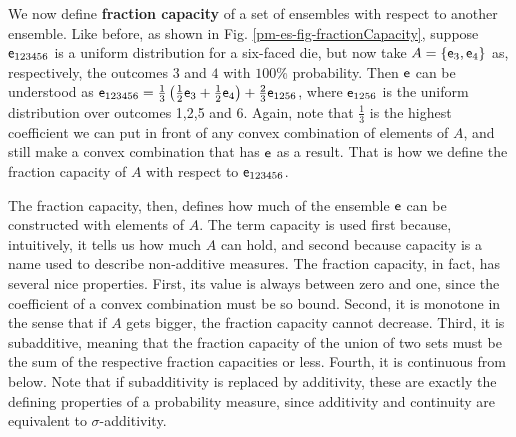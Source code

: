 We now define \textbf{fraction capacity} of a set of ensembles with respect to another ensemble. Like before, as shown in Fig. \ref{pm-es-fig-fractionCapacity}, suppose $\mathsf{e}_{123456}$ is a uniform distribution for a six-faced die, but now take $A = \{ \mathsf{e}_3, \mathsf{e}_4 \}$ as, respectively, the outcomes $3$ and $4$ with $100\%$ probability. Then $\mathsf{e}$ can be understood as $\mathsf{e}_{123456} = \frac{1}{3} \left(\frac{1}{2} \mathsf{e}_3 + \frac{1}{2} \mathsf{e}_4 \right) + \frac{2}{3} \mathsf{e}_{1256}$, where $\mathsf{e}_{1256}$ is the uniform distribution over outcomes 1,2,5 and 6. Again, note that $\frac{1}{3}$ is the highest coefficient we can put in front of any convex combination of elements of $A$, and still make a convex combination that has $\mathsf{e}$ as a result. That is how we define the fraction capacity of $A$ with respect to $\mathsf{e}_{123456}$.

The fraction capacity, then, defines how much of the ensemble $\mathsf{e}$ can be constructed with elements of $A$. The term capacity is used first because, intuitively, it tells us how much $A$ can hold, and second because capacity is a name used to describe non-additive measures. The fraction capacity, in fact, has several nice properties. First, its value is always between zero and one, since the coefficient of a convex combination must be so bound. Second, it is monotone in the sense that if $A$ gets bigger, the fraction capacity cannot decrease. Third, it is subadditive, meaning that the fraction capacity of the union of two sets must be the sum of the respective fraction capacities or less. Fourth, it is continuous from below. Note that if subadditivity is replaced by additivity, these are exactly the defining properties of a probability measure, since additivity and continuity are equivalent to $\sigma$-additivity.

